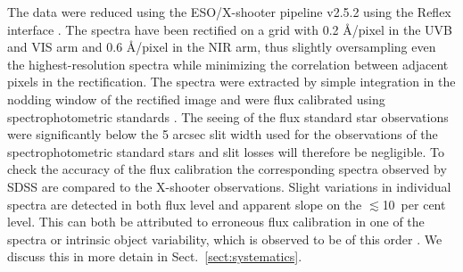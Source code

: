 \documentclass{aa}    %
\newcommand{\sectionname}{Sect.}
\newcommand{\Sect}[1]{\sectionname~\ref{sect:#1}}
\newcommand{\sect}[1]{\Sect{#1}}
\newcommand{\todo}[3]{{\color{#2}\emph{#1}: #3}}
\newcommand{\qtodo}[1]{\todo{Question}{red}{#1}}
\begin{document}
%
%
%
%
%

The data were reduced using the ESO/X-shooter pipeline v2.5.2 \citep{Modigliani2010} using the Reflex interface \citep{Freudling2013}. The spectra have been rectified on a grid with 0.2 \AA/pixel in the UVB and VIS arm and 0.6 \AA/pixel in the NIR arm, thus slightly oversampling even the highest-resolution spectra while minimizing the correlation between adjacent pixels in the rectification. The spectra were extracted by simple integration in the nodding window of the rectified image and were flux calibrated using spectrophotometric standards \citep{Vernet2010, Hamuy1994}. The seeing of the flux standard star observations were significantly below the 5 arcsec slit width used for the observations of the spectrophotometric standard stars and slit losses will therefore be negligible. To check the accuracy of the flux calibration the corresponding spectra observed by SDSS \citep{Ahn2014} are compared to the X-shooter observations. Slight variations in individual spectra are detected in both flux level and apparent slope on the $\lesssim$10~per cent level. This can both be attributed to erroneous flux calibration in one of the spectra or intrinsic object variability, which is observed to be of this order \citep{MacLeod2012, Morganson2014}. We discuss this in more detain in \sect{systematics}.
\end{document}
